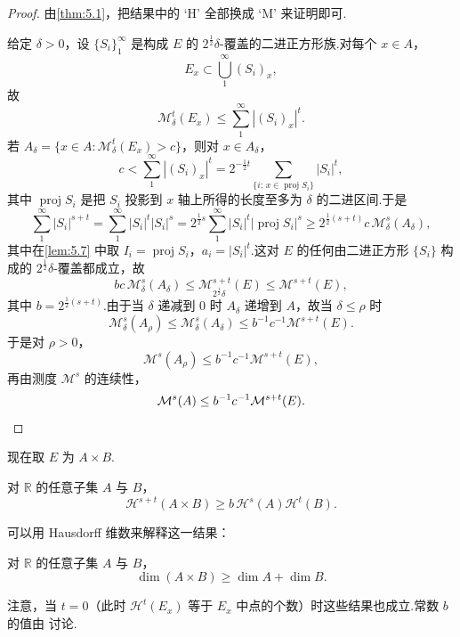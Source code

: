 \begin{proof}
由\cref{thm:5.1}，把结果中的 `H' 全部换成 `M' 来证明即可.

给定 $\delta>0$，设 $\{S_i\}_{1}^{\infty}$ 是构成 $E$ 的 $2^{\frac{1}{2}}\delta$-覆盖的二进正方形族.对每个 $x\in A$，
\[
  E_x\subset\bigcup_{1}^{\infty}(S_i)_x,
\]
故
\[
  \mathcal{M}^{t}_{\delta}(E_x)\leq\sum_{1}^{\infty}|(S_i)_x|^{t}.
\]
若 $A_{\delta}=\{x\in A:\mathcal{M}^{t}_{\delta}(E_x)>c\}$，则对 $x\in A_{\delta}$，
\[
  c<\sum_{1}^{\infty}|(S_i)_x|^{t}
  =2^{-\frac{1}{2}t}\sum_{\{i:\,x\in\operatorname{proj}S_i\}}|S_i|^{t},
\]
其中 $\operatorname{proj}S_i$ 是把 $S_i$ 投影到 $x$ 轴上所得的长度至多为 $\delta$ 的二进区间.于是
\[
  \sum_{1}^{\infty}|S_i|^{s+t}
  =\sum_{1}^{\infty}|S_i|^{t}|S_i|^{s}
  =2^{\frac{1}{2}s}\sum_{1}^{\infty}|S_i|^{t}|\operatorname{proj}S_i|^{s}
  \geq 2^{\frac{1}{2}(s+t)}c\,\mathcal{M}^{s}_{\delta}(A_{\delta}),
\]
其中在\cref{lem:5.7} 中取 $I_i=\operatorname{proj}S_i$，$a_i=|S_i|^t$.这对 $E$ 的任何由二进正方形 $\{S_i\}$ 构成的 $2^{\frac{1}{2}}\delta$-覆盖都成立，故
\[
  bc\,\mathcal{M}^{s}_{\delta}(A_{\delta})\leq\mathcal{M}^{s+t}_{2^{\frac{1}{2}}\delta}(E)\leq\mathcal{M}^{s+t}(E),
\]
其中 $b=2^{\frac{1}{2}(s+t)}$.由于当 $\delta$ 递减到 $0$ 时 $A_{\delta}$ 递增到 $A$，故当 $\delta\leq\rho$ 时
\[
  \mathcal{M}^{s}_{\delta}(A_{\rho})\leq\mathcal{M}^{s}_{\delta}(A_{\delta})\leq b^{-1}c^{-1}\mathcal{M}^{s+t}(E).
\]
于是对 $\rho>0$，
\[
  \mathcal{M}^{s}(A_{\rho})\leq b^{-1}c^{-1}\mathcal{M}^{s+t}(E),
\]
再由测度 $\mathcal{M}^s$ 的连续性，
\[
  \mathcal{M}^{s}(A)\leq b^{-1}c^{-1}\mathcal{M}^{s+t}(E). \qedhere
\]
\end{proof}

现在取 $E$ 为 $A\times B$.

\begin{corollary}\label{cor:5.9}
对 $\mathbb{R}$ 的任意子集 $A$ 与 $B$，
\[
  \mathcal{H}^{s+t}(A\times B)\geq b\,\mathcal{H}^{s}(A)\mathcal{H}^{t}(B).
\]
\end{corollary}

可以用 Hausdorff 维数来解释这一结果：

\begin{corollary}\label{cor:5.10}
对 $\mathbb{R}$ 的任意子集 $A$ 与 $B$，
\[
  \dim(A\times B)\geq\dim A+\dim B.
\]
\end{corollary}

注意，当 $t=0$（此时 $\mathcal{H}^t(E_x)$ 等于 $E_x$ 中点的个数）时这些结果也成立.常数 $b$ 的值由 \textcite{ernstfreilich1976} 讨论.

